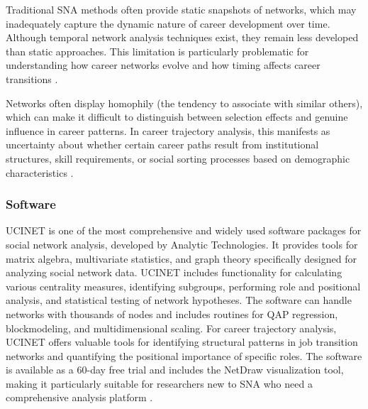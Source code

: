 \documentclass[../main.tex]{subfiles}
\begin{document}

Traditional SNA methods often provide static snapshots of networks, which may inadequately capture the dynamic nature of career development over time. Although temporal network analysis techniques exist, they remain less developed than static approaches. This limitation is particularly problematic for understanding how career networks evolve and how timing affects career transitions \citep{wikipedia_sna}.


Networks often display homophily (the tendency to associate with similar others), which can make it difficult to distinguish between selection effects and genuine influence in career patterns. In career trajectory analysis, this manifests as uncertainty about whether certain career paths result from institutional structures, skill requirements, or social sorting processes based on demographic characteristics \citep{insna}.

\subsubsection{Software}


UCINET is one of the most comprehensive and widely used software packages for social network analysis, developed by Analytic Technologies. It provides tools for matrix algebra, multivariate statistics, and graph theory specifically designed for analyzing social network data. UCINET includes functionality for calculating various centrality measures, identifying subgroups, performing role and positional analysis, and statistical testing of network hypotheses. The software can handle networks with thousands of nodes and includes routines for QAP regression, blockmodeling, and multidimensional scaling. For career trajectory analysis, UCINET offers valuable tools for identifying structural patterns in job transition networks and quantifying the positional importance of specific roles. The software is available as a 60-day free trial and includes the NetDraw visualization tool, making it particularly suitable for researchers new to SNA who need a comprehensive analysis platform \citep{butts_methodological_2008}.

\end{document}
